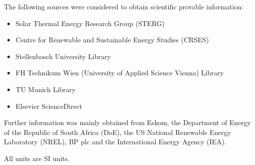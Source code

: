 The following sources were considered to obtain scientific provable information:
\begin{itemize}
\item Solar Thermal Energy Research Group (STERG)
\item Centre for Renewable and Sustainable Energy Studies (CRSES)
\item Stellenbosch University Library
\item FH Technikum Wien (University of Applied Science Vienna) Library
\item TU Munich Library
\item Elsevier ScienceDirect
\end{itemize}


Further information was mainly obtained from Eskom, the Department of Energy of the Republic of South Africa (DoE), the US National Renewable Energy Laboratory (NREL), BP plc and the International Energy Agency (IEA).


All units are SI units.




